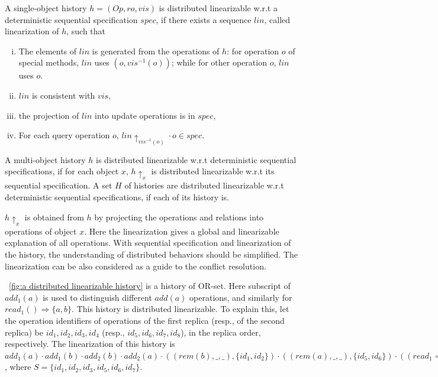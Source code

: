 \begin{definition}
\label{definition:distributed linearizability}

A single-object history $h = (\mathit{Op},\mathit{ro},\mathit{vis})$ is distributed linearizable w.r.t a deterministic sequential specification $\mathit{spec}$, if there exists a sequence $\mathit{lin}$, called linearization of $h$, such that

\begin{enumerate}[(i)]
\item The elements of $\mathit{lin}$ is generated from the operations of $h$: for operation $o$ of special methods, $\mathit{lin}$ uses $(o,\mathit{vis}^{-1}(o))$; while for other operation $o$, $\mathit{lin}$ uses $o$.
\item $\mathit{lin}$ is consistent with $\mathit{vis}$,
\item the projection of $\mathit{lin}$ into update operations is in $\mathit{spec}$,
\item For each query operation $o$, $\mathit{lin} \uparrow_{ \mathit{vis}^{-1}(o)  } \cdot o \in \mathit{spec}$.
\end{enumerate}

A multi-object history $h$ is distributed linearizable w.r.t deterministic sequential specifications, if for each object $x$, $h \uparrow_{x}$ is distributed linearizable w.r.t its sequential specification. A set $H$ of histories are distributed linearizable w.r.t deterministic sequential specifications, if each of its history is.
\end{definition}

$h \uparrow_{x}$ is obtained from $h$ by projecting the operations and relations into operations of object $x$. Here the linearization gives a global and linearizable explanation of all operations. With sequential specification and linearization of the history, the understanding of distributed behaviors should be simplified. The linearization can be also considered as a guide to the conflict resolution.

\figurename~\ref{fig:a distributed linearizable history} is a history of OR-set. Here subscript of $\mathit{add}_1(a)$ is used to distinguish different $\mathit{add}(a)$ operations, and similarly for $\mathit{read}_1() \Rightarrow \{ a,b \}$. This history is distributed linearizable. To explain this, let the operation identifiers of operations of the first replica (resp., of the second replica) be $\mathit{id}_1,\mathit{id}_2,\mathit{id}_3,\mathit{id}_4$ (resp., $\mathit{id}_5,\mathit{id}_6,\mathit{id}_7,\mathit{id}_8$), in the replica order, respectively. The linearization of this history is $\mathit{add}_1(a) \cdot \mathit{add}_1(b) \cdot \mathit{add}_2(b) \cdot \mathit{add}_2(a) \cdot ((\mathit{rem}(b),\_,\_),\{ \mathit{id}_1, \mathit{id}_2 \}) \cdot ((\mathit{rem}(a),\_,\_),\{ \mathit{id}_5, \mathit{id}_6 \}) \cdot ((\mathit{read}_1 \Rightarrow \{ a,b \},\_,\_), S ) \cdot ((\mathit{read}_2 \Rightarrow \{ a,b \},\_,\_), S )$, where $S = \{ \mathit{id}_1, \mathit{id}_2, \mathit{id}_3, \mathit{id}_5, \mathit{id}_6, \mathit{id}_7 \}$.

